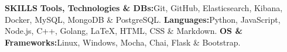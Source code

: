 \documentclass[a4paper, 12pt]{article}
\begin{document}
\section*{}
\begin{vwcol}[widths={0.2, 0.8}, justify=flush, sep=0.7cm, rule=0pt, indent=1em]
\large{\textbf{\textcolor{uclagold}{SKILLS}}}\newline\newline\newline\newline\newline\newline\newline\newline\newline\newline\newline\newline
\large{\textbf{Tools, Technologies \& DBs:\newline}Git, GitHub, Elasticsearch, Kibana, Docker, MySQL, MongoDB \& PostgreSQL.}\vspace{0.3cm}\newline
\large{\textbf{Languages:\newline}Python, JavaScript, Node.js, C++, Golang, LaTeX, HTML, CSS \& Markdown.}\vspace{0.3cm}\newline
\large{\textbf{OS \& Frameworks:\newline}Linux, Windows, Mocha, Chai, Flask \& Bootstrap.}
\normalsize
\end{vwcol}

\vspace{-2.1cm}
\end{document}
